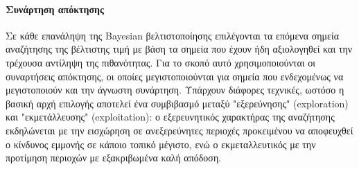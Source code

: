  	\paragraph{Συνάρτηση απόκτησης} Σε κάθε επανάληψη της Bayesian βελτιστοποίησης επιλέγονται τα επόμενα σημεία αναζήτησης της βέλτιστης τιμή με βάση τα σημεία που έχουν ήδη αξιολογηθεί και την τρέχουσα αντίληψη της πιθανότητας. Για το σκοπό αυτό χρησιμοποιούνται οι συναρτήσεις απόκτησης, οι οποίες μεγιστοποιούνται για σημεία που ενδεχομένως να μεγιστοποιούν και την άγνωστη συνάρτηση. Υπάρχουν διάφορες τεχνικές, ωστόσο η βασική αρχή επιλογής αποτελεί ένα συμβιβασμό μεταξύ "εξερεύνησης" (exploration) και "εκμετάλλευσης" (exploitation): ο εξερευνητικός χαρακτήρας της αναζήτησης εκδηλώνεται με την εισχώρηση σε ανεξερεύνητες περιοχές προκειμένου να αποφευχθεί ο κίνδυνος εμμονής σε κάποιο τοπικό μέγιστο, ενώ ο εκμεταλλευτικός με την προτίμηση περιοχών με εξακριβωμένα καλή απόδοση.
